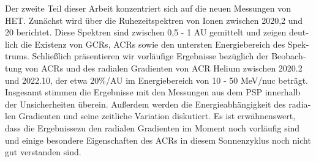 \begin{otherlanguage}{ngerman}
    Der zweite Teil dieser Arbeit konzentriert sich auf die neuen Messungen von \ac{HET}. Zunächst wird über die Ruhezeitspektren von Ionen zwischen 2020,2 und 20 berichtet. Diese Spektren sind zwischen 0,5 - 1 AU gemittelt und zeigen deutlich die Existenz von \acp{GCR}, \acp{ACR} sowie den untersten Energiebereich des Spektrums. Schließlich präsentieren wir vorläufige Ergebnisse bezüglich der Beobachtung von \acp{ACR} und des radialen Gradienten von \ac{ACR} Helium zwischen 2020.2 und 2022.10, der etwa 20\%/AU im Energiebereich von 10 - 50 MeV/nuc beträgt. Insgesamt stimmen die Ergebnisse mit den Messungen aus dem \ac{PSP} innerhalb der Unsicherheiten überein. Außerdem werden die Energieabhängigkeit des radialen Gradienten und seine zeitliche Variation diskutiert. Es ist erwähnenswert, dass die Ergebnissezu den radialen Gradienten im Moment noch vorläufig sind und  einige besondere Eigenschaften des ACRs in diesem Sonnenzyklus noch nicht gut verstanden sind.
    

\end{otherlanguage}